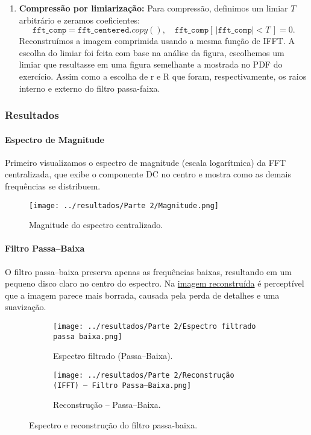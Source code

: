 \documentclass[12pt,a4paper]{article}
\begin{document}
\begin{enumerate}
\begin{lstlisting}[language=Python, caption={Função de reconstrução de imagem}]
      \end{lstlisting}

  \item \textbf{Compressão por limiarização:}  
    Para compressão, definimos um limiar \(T\) arbitrário e zeramos coeficientes:
    \[
      \mathtt{fft\_comp} = \mathtt{fft\_centered}.copy(),\quad
      \mathtt{fft\_comp}[\,|\mathtt{fft\_comp}| < T\,] = 0.
    \]
    Reconstruímos a imagem comprimida usando a mesma função de IFFT.
    A escolha do limiar foi feita com base na análise da figura, escolhemos um limiar que resultasse em uma figura semelhante a mostrada no PDF do exercício. Assim como a escolha de r e R que foram, respectivamente, os raios interno e externo do filtro passa-faixa. 
\end{enumerate}

\subsubsection*{Resultados}

\paragraph{Espectro de Magnitude}
Primeiro visualizamos o espectro de magnitude (escala logarítmica) da FFT centralizada, que exibe o componente DC no centro e mostra como as demais frequências se distribuem.

\begin{figure}[H]
  \centering
  \texttt{[image: ../resultados/Parte 2/Magnitude.png]}
  \caption{Magnitude do espectro centralizado.}
  \label{fig:espec_magnitude}
\end{figure}

\paragraph{Filtro Passa–Baixa}
O filtro passa–baixa preserva apenas as frequências baixas, resultando em um pequeno disco claro no centro do espectro. Na  \href{fig:rec_pb}{imagem reconstruída} é perceptível que a imagem parece mais borrada, causada pela perda de detalhes e uma suavização.

\begin{figure}[H]
  \centering
  \begin{subfigure}[b]{0.45\linewidth}
    \centering
    \texttt{[image: ../resultados/Parte 2/Espectro filtrado passa baixa.png]}
    \caption{Espectro filtrado (Passa–Baixa).}
    \label{fig:espec_pb}
  \end{subfigure}
  \hfill
  \begin{subfigure}[b]{0.45\linewidth}
    \centering
    \texttt{[image: ../resultados/Parte 2/Reconstrução (IFFT) — Filtro Passa–Baixa.png]}
    \caption{Reconstrução – Passa–Baixa.}
    \label{fig:rec_pb}
  \end{subfigure}
  \caption{Espectro e reconstrução do filtro passa-baixa.}
  \label{fig:pb_comparacao}
\end{figure}
\end{document}
